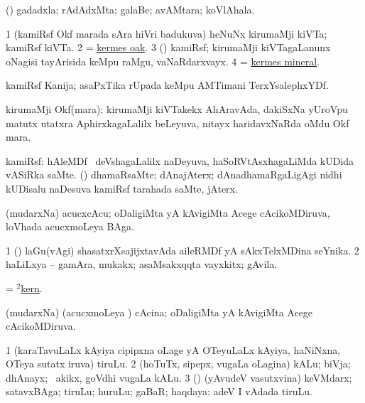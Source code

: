 \bentry
{}
\gl{\nA}
\bmng
(\AmA) gadadxla; rAdAdxMta; galaBe; avAMtara; koVlAhala. 
\emng
\eentry

\bentry
{}
\gl{\nA}
\bmng
\bnum
\num{1} (kamiRsf Okf marada sAra hiVri badukuva) heNuNx kirumaMji kiVTa; kamiRsf kiVTa. 
\num{2}  = \hyperlink{kermes oak}{kermes oak}. 
\num{3} (\ravi) kamiRsf; kirumaMji kiVTagaLanunx oNagisi tayArisida keMpu raMgu, vaNaRdarxvayx. 
\num{4}  = \hyperlink{kermes mineral}{kermes mineral}. 
\enum
\emng
\eentry

\bentry
{}
\gl{\nA}
\bmng
kamiRsf Kanija; asaPxTika rUpada keMpu AMTimani TerxYsalephxYDf. 
\emng
\eentry

\bentry
{}
\gl{\nA}
\bmng
kirumaMji Okf(mara); kirumaMji kiVTakekx AhAravAda, dakiSxNa yUroVpu matutx utatxra AphirxkagaLalilx beLeyuva, nitayx haridavxNaRda oMdu Okf mara. 
\emng
\eentry

\bentry
{}
\gl{\nA}
\bmng
kamiRsf: 
\banum
{} hAleMDf \mo\ deVshagaLalilx naDeyuva, haSoRVtAsxhagaLiMda kUDida vASiRka saMte. 
 (\ame) dhamaRsaMte; dAnajAterx; dAnadhamaRgaLigAgi nidhi kUDisalu naDesuva kamiRsf tarahada saMte, jAterx. 
\eanum
\emng
\eentry

\bentry
{}
\gl{\nA}
\bmng
(mudarxNa) acucxcAcu; oDaligiMta yA kAvigiMta Acege cAcikoMDiruva, loVhada acucxmoLeya BAga. 
\emng
\eentry

\bentry
{}
\gl{\nA}
\bmng
\bnum
\num{1} (\ca) laGu(vAgi) shasatxrXsajijxtavAda aileRMDf yA sAkxTelxMDina seYnika. 
\num{2} haLiLxya -- gamAra, mukakx; asaMsakxqqta vayxkitx; gAvila. 
\enum
\emng
\eentry

\bentry
{}
\gl{\nA}
\bmng
 = \hyperlink{kern(2)}{$^2$kern}. 
\emng
\eentry

\bentry
{}
\gl{\gu}
\bmng
(mudarxNa) (acucxmoLeya \vi) cAcina; oDaligiMta yA kAvigiMta Acege cAcikoMDiruva. 
\emng
\eentry

\bentry
{}
\gl{\nA}
\bmng
\bnum
\num{1} (karaTavuLaLx kAyiya cipipxna oLage yA OTeyuLaLx kAyiya, haNiNxna, OTeya sutatx iruva) tiruLu. 
\num{2} (hoTuTx, sipepx, \mo vugaLa oLagina) kALu; biVja; dhAnayx; \udA\ akikx, goVdhi \mo vugaLa kALu. 
\num{3} (\rUpa) (yAvudeV vasutxvina) keVMdarx; satavxBAga; tiruLu; huruLu; gaBaR; haqdaya:  adeV I vAdada tiruLu. 
\enum
\emng
\eentry

